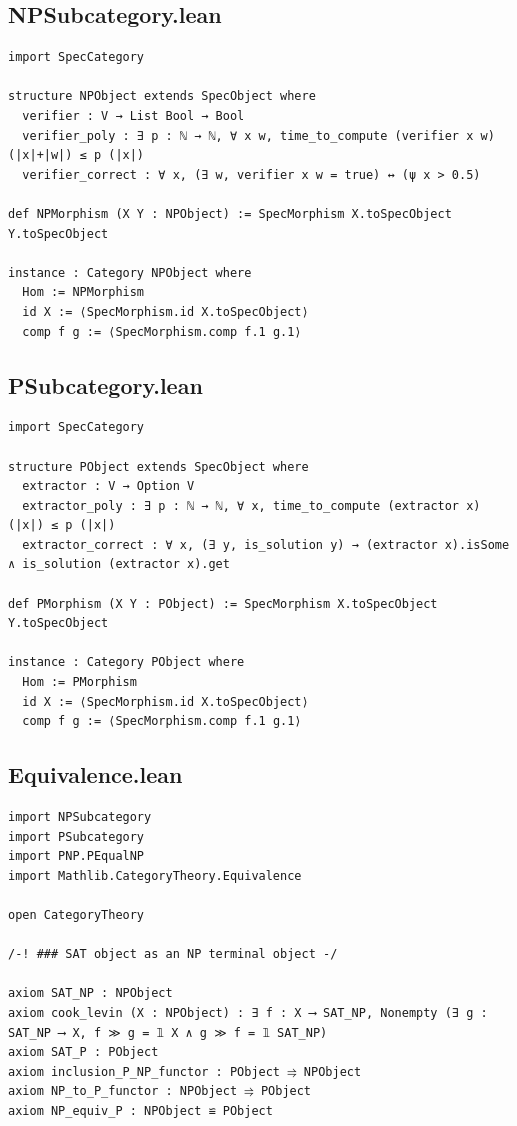 \documentclass[11pt,a4paper]{article}
\begin{document}
\subsection{NPSubcategory.lean}

\begin{lstlisting}[style=lean, caption={NPSubcategory.lean}]
import SpecCategory

structure NPObject extends SpecObject where
  verifier : V → List Bool → Bool
  verifier_poly : ∃ p : ℕ → ℕ, ∀ x w, time_to_compute (verifier x w) (|x|+|w|) ≤ p (|x|)
  verifier_correct : ∀ x, (∃ w, verifier x w = true) ↔ (ψ x > 0.5)

def NPMorphism (X Y : NPObject) := SpecMorphism X.toSpecObject Y.toSpecObject

instance : Category NPObject where
  Hom := NPMorphism
  id X := ⟨SpecMorphism.id X.toSpecObject⟩
  comp f g := ⟨SpecMorphism.comp f.1 g.1⟩
\end{lstlisting}

\subsection{PSubcategory.lean}

\begin{lstlisting}[style=lean, caption={PSubcategory.lean}]
import SpecCategory

structure PObject extends SpecObject where
  extractor : V → Option V
  extractor_poly : ∃ p : ℕ → ℕ, ∀ x, time_to_compute (extractor x) (|x|) ≤ p (|x|)
  extractor_correct : ∀ x, (∃ y, is_solution y) → (extractor x).isSome ∧ is_solution (extractor x).get

def PMorphism (X Y : PObject) := SpecMorphism X.toSpecObject Y.toSpecObject

instance : Category PObject where
  Hom := PMorphism
  id X := ⟨SpecMorphism.id X.toSpecObject⟩
  comp f g := ⟨SpecMorphism.comp f.1 g.1⟩
\end{lstlisting}

\subsection{Equivalence.lean}

\begin{lstlisting}[style=lean, caption={Equivalence.lean}]
import NPSubcategory
import PSubcategory
import PNP.PEqualNP
import Mathlib.CategoryTheory.Equivalence

open CategoryTheory

/-! ### SAT object as an NP terminal object -/

axiom SAT_NP : NPObject
axiom cook_levin (X : NPObject) : ∃ f : X ⟶ SAT_NP, Nonempty (∃ g : SAT_NP ⟶ X, f ≫ g = 𝟙 X ∧ g ≫ f = 𝟙 SAT_NP)
axiom SAT_P : PObject
axiom inclusion_P_NP_functor : PObject ⥤ NPObject
axiom NP_to_P_functor : NPObject ⥤ PObject
axiom NP_equiv_P : NPObject ≌ PObject
\end{lstlisting}
\end{document}

